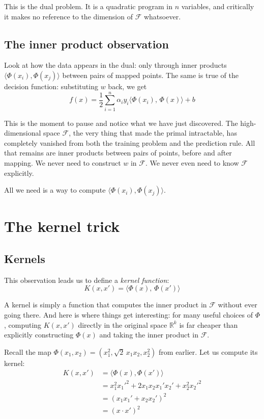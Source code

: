 \documentclass[12pt,a4paper]{article}
\begin{document}
This is the dual problem. It is a quadratic program in $n$ variables, and
critically it makes no reference to the dimension of $\mathcal{F}$ whatsoever.

\subsection{The inner product observation}

Look at how the data appears in the dual: only through inner products
$\langle \Phi(x_i), \Phi(x_j) \rangle$ between pairs of mapped points.
The same is true of the decision function: substituting $w$ back, we get
\[
f(x) = \frac{1}{2}\sum_{i=1}^n \alpha_i y_i
\langle \Phi(x_i),\, \Phi(x) \rangle + b
\]

This is the moment to pause and notice what we have just discovered. The
high-dimensional space $\mathcal{F}$, the very thing that made the primal
intractable, has completely vanished from both the training problem and the
prediction rule. All that remains are inner products between pairs of points,
before and after mapping. We never need to construct $w$ in $\mathcal{F}$.
We never even need to know $\mathcal{F}$ explicitly.

All we need is a way to compute $\langle \Phi(x_i), \Phi(x_j) \rangle$.

\newpage

\section{The kernel trick}

\subsection{Kernels}

This observation leads us to define a \emph{kernel function}:
\[
K(x, x') = \langle \Phi(x),\, \Phi(x') \rangle
\]

A kernel is simply a function that computes the inner product in $\mathcal{F}$
without ever going there. And here is where things get interesting: for many
useful choices of $\Phi$, computing $K(x, x')$ directly in the original
space $\mathbb{R}^k$ is far cheaper than explicitly constructing $\Phi(x)$
and taking the inner product in $\mathcal{F}$.

Recall the map $\Phi(x_1, x_2) = (x_1^2, \sqrt{2}\,x_1 x_2, x_2^2)$ from
earlier. Let us compute its kernel:
\begin{align*}
K(x, x')
&= \langle \Phi(x), \Phi(x') \rangle \\
&= x_1^2 {x_1'}^2 + 2 x_1 x_2 x_1' x_2' + x_2^2 {x_2'}^2 \\
&= (x_1 x_1' + x_2 x_2')^2 \\
&= (x \cdot x')^2
\end{align*}
\end{document}
